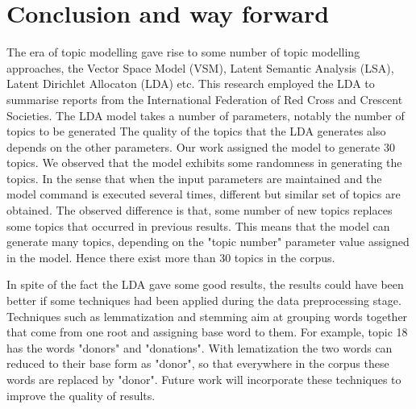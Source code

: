 \chapter{Conclusion and way forward}

The era of topic modelling gave rise to some number of topic modelling approaches, the Vector Space Model (VSM), Latent Semantic Analysis (LSA), Latent Dirichlet Allocaton (LDA) etc. This research employed the LDA to summarise reports from the International Federation of Red Cross and Crescent Societies. The LDA model takes a number of parameters, notably the number of topics to be generated The quality of the topics that the LDA generates also depends on the other parameters. Our work assigned the model to generate 30 topics. We observed that the model exhibits some randomness in generating the topics. In the sense that when the input parameters are maintained and the model command is executed several times, different but similar set of topics are obtained. The observed difference is that, some number of new topics replaces some topics that occurred in previous results. This means that the model can generate  many topics, depending on the "topic number" parameter value assigned in the model. Hence there exist more than 30 topics in the corpus.

In spite of the fact the LDA gave some good results, the results could have been better if some techniques had been applied during the data preprocessing stage. Techniques such as lemmatization and stemming aim at grouping words together that come from one root and assigning base word to them. For example, topic 18 has the words "donors" and "donations". With lematization the two words can reduced to their base form as "donor", so that everywhere in the corpus these words are replaced by "donor".  
Future work will incorporate these techniques to improve the quality of results.
